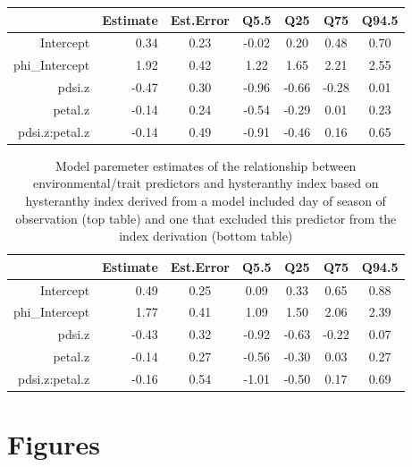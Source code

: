 \documentclass{article}[11pt]
\begin{document}
\begin{table}[ht]
\centering
\begin{tabular}{rrccccc}
  \hline
 & Estimate & Est.Error & Q5.5 & Q25 & Q75 & Q94.5 \\ 
  \hline
Intercept & 0.34 & 0.23 & -0.02 & 0.20 & 0.48 & 0.70 \\ 
  phi\_Intercept & 1.92 & 0.42 & 1.22 & 1.65 & 2.21 & 2.55 \\ 
  pdsi.z & -0.47 & 0.30 & -0.96 & -0.66 & -0.28 & 0.01 \\ 
  petal.z & -0.14 & 0.24 & -0.54 & -0.29 & 0.01 & 0.23 \\ 
  pdsi.z:petal.z & -0.14 & 0.49 & -0.91 & -0.46 & 0.16 & 0.65 \\ 
   \hline
\end{tabular}
\end{table}
\begin{table}
\centering
\begin{tabular}{rrccccc}
  \hline
 & Estimate & Est.Error & Q5.5 & Q25 & Q75 & Q94.5 \\ 
  \hline
Intercept & 0.49 & 0.25 & 0.09 & 0.33 & 0.65 & 0.88 \\ 
  phi\_Intercept & 1.77 & 0.41 & 1.09 & 1.50 & 2.06 & 2.39 \\ 
  pdsi.z & -0.43 & 0.32 & -0.92 & -0.63 & -0.22 & 0.07 \\ 
  petal.z & -0.14 & 0.27 & -0.56 & -0.30 & 0.03 & 0.27 \\ 
  pdsi.z:petal.z & -0.16 & 0.54 & -1.01 & -0.50 & 0.17 & 0.69 \\ 
   \hline
\end{tabular}
\caption{Model paremeter estimates of the relationship between environmental/trait predictors and hysteranthy index based on hysteranthy index derived from a model included day of season of observation (top table) and one that excluded this predictor from the index derivation (bottom table)}
\label{tab:nodoy}
\end{table}

\pagebreak[4]

\section*{Figures} 
\end{document}
